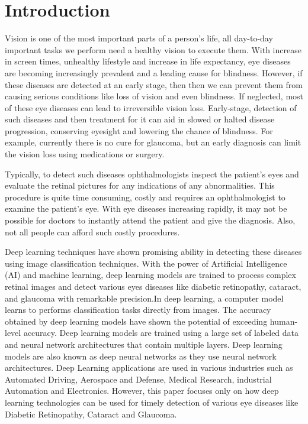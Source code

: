 \documentclass[conference]{IEEEtran}
\begin{document}
\section{Introduction}
Vision is one of the most important parts of a person’s life, all day-to-day important tasks we perform need a healthy vision to execute them. With increase in screen times, unhealthy lifestyle and increase in life expectancy, eye diseases are becoming increasingly prevalent and a leading cause for blindness. However, if these diseases are detected at an early stage, then then we can prevent them from causing serious conditions like loss of vision and even blindness. If neglected, most of these eye diseases can lead to irreversible vision loss. Early-stage, detection of such diseases and then treatment for it can aid in slowed or halted disease progression, conserving eyesight and lowering the chance of blindness. For example, currently there is no cure for glaucoma, but an early diagnosis can limit the vision loss using medications or surgery.

\vspace{5pt}
Typically, to detect such diseases ophthalmologists inspect the patient’s eyes and evaluate the retinal pictures for any indications of any abnormalities. This procedure is quite time consuming, costly and requires an ophthalmologist to examine the patient’s eye. With eye diseases increasing rapidly, it may not be possible for doctors to instantly attend the patient and give the diagnosis. Also, not all people can afford such costly procedures.

\vspace{5pt} 
Deep learning techniques have shown promising ability in detecting these diseases using image classification techniques. With the power of Artificial Intelligence (AI) and machine learning, deep learning models are trained to process complex retinal images and detect various eyes diseases like diabetic retinopathy, cataract, and glaucoma with remarkable precision.In deep learning, a computer model learns to performs classification tasks directly from images. The accuracy obtained by deep learning models have shown the potential of exceeding human-level accuracy. Deep learning models are trained using a large set of labeled data and neural network architectures that contain multiple layers. Deep learning models are also known as deep neural networks as they use neural network architectures. Deep Learning applications are used in various industries such as Automated Driving, Aerospace and Defense, Medical Research, industrial Automation and Electronics. However, this paper focuses only on how deep learning technologies can be used for timely detection of various eye diseases like Diabetic Retinopathy, Cataract and Glaucoma. 
\end{document}
